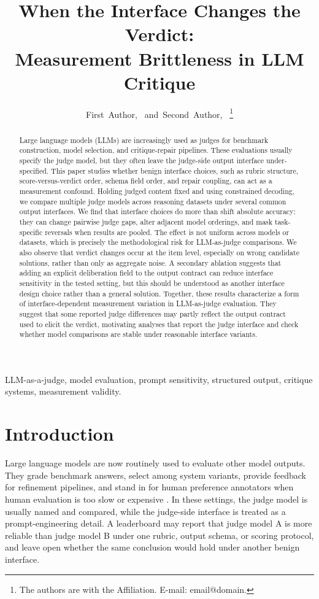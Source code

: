\documentclass[journal]{IEEEtran}
\title{When the Interface Changes the Verdict:\\Measurement Brittleness in LLM Critique}
\author{
  First~Author,~\IEEEmembership{Member,~IEEE,}
  and~Second~Author,~\IEEEmembership{Member,~IEEE}%
  \thanks{The authors are with the Affiliation.
          E-mail: email@domain.}
}
\begin{document}
\maketitle

\begin{abstract}
Large language models (LLMs) are increasingly used as judges for benchmark construction, model selection, and critique-repair pipelines. These evaluations usually specify the judge model, but they often leave the judge-side output interface under-specified. This paper studies whether benign interface choices, such as rubric structure, score-versus-verdict order, schema field order, and repair coupling, can act as a measurement confound. Holding judged content fixed and using constrained decoding, we compare multiple judge models across reasoning datasets under several common output interfaces. We find that interface choices do more than shift absolute accuracy: they can change pairwise judge gaps, alter adjacent model orderings, and mask task-specific reversals when results are pooled. The effect is not uniform across models or datasets, which is precisely the methodological risk for LLM-as-judge comparisons. We also observe that verdict changes occur at the item level, especially on wrong candidate solutions, rather than only as aggregate noise. A secondary ablation suggests that adding an explicit deliberation field to the output contract can reduce interface sensitivity in the tested setting, but this should be understood as another interface design choice rather than a general solution. Together, these results characterize a form of interface-dependent measurement variation in LLM-as-judge evaluation. They suggest that some reported judge differences may partly reflect the output contract used to elicit the verdict, motivating analyses that report the judge interface and check whether model comparisons are stable under reasonable interface variants.
\end{abstract}

\begin{IEEEkeywords}
LLM-as-a-judge, model evaluation, prompt sensitivity, structured output, critique systems, measurement validity.
\end{IEEEkeywords}

\section{Introduction}
\label{sec:intro}

Large language models are now routinely used to evaluate other model outputs. They grade benchmark answers, select among system variants, provide feedback for refinement pipelines, and stand in for human preference annotators when human evaluation is too slow or expensive \citep{liu2023geval, zheng2024judging, kim2024prometheus, lambert2024rewardbench}. In these settings, the judge model is usually named and compared, while the judge-side interface is treated as a prompt-engineering detail. A leaderboard may report that judge model A is more reliable than judge model B under one rubric, output schema, or scoring protocol, and leave open whether the same conclusion would hold under another benign interface.
\end{document}
